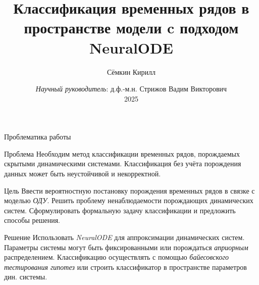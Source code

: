 \documentclass[10pt]{beamer}
\title{Классификация временных рядов в пространстве модели c подходом NeuralODE}
\author{Сёмкин Кирилл}
\institute[MIPT]{Московский физико-технический институт \\ Кафедра интеллектуальных систем}
\date[2025]{\textit{Научный руководитель}: д.ф.-м.н. Стрижов Вадим Викторович \\ 2025}
\theoremstyle{definition}
\begin{document}
	
	\begin{frame}[c]
		\titlepage
	\end{frame}
	
	\begin{frame}{Проблематика работы}
		
		\begin{alertblock}{Проблема}
			Необходим метод классификации временных рядов, порождаемых скрытыми динамическими системами. Классификация без учёта порождения данных может быть неустойчивой и некорректной.
		\end{alertblock}
		
		\begin{block}{Цель}
			Ввести вероятностную постановку порождения временных рядов в связке с моделью \emph{ОДУ}. Решить проблему ненаблюдаемости порождающих динамических систем. Сформулировать формальную задачу классификации и предложить способы решения.
		\end{block}
		
		\begin{exampleblock}{Решение}
			Использовать \emph{NeuralODE} для аппроксимации динамических систем. Параметры системы могут быть фиксированными или порождаться \emph{априорным} распределением. Классификацию осуществлять с помощью \emph{байесовского тестирования гипотез} или строить классификатор в пространстве параметров дин. системы.
		\end{exampleblock}
		
	\end{frame}	
	
\end{document}
